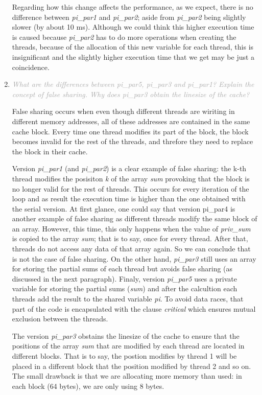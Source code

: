 \documentclass{article}
\newcommand{\greyItem}[1]{\item\emph{\textcolor{darkgray}{#1}}}
\begin{document}
\begin{enumerate}[label=4.\arabic*,leftmargin=*]
Regarding how this change affects the performance, as we expect, there is no difference between \emph{pi\_par1} and \emph{pi\_par2}; aside from \emph{pi\_par2} being slightly slower (by about 10 ms). Although we could think this higher execution time is caused because \emph{pi\_par2} has to do more operations when creating the threads, because of the allocation of this new variable for each thread, this is insignificant and the slightly higher execution time that we get may be just a coincidence.

\greyItem{What are the differences between pi\_par5, pi\_par3 and pi\_par1? Explain the concept of false sharing. 
Why does pi\_par3 obtain the linesize of the cache?}

False sharing occurs when even though different threads are wiriting in different memory addresses, all of these addresses are contained in the same cache block. Every time one thread modifies its part of the block, the block becomes invalid for the rest of the threads, and threfore they need to replace the block in their cache.

Version \emph{pi\_par1} (and \emph{pi\_par2}) is a clear example of false sharing: the k-th thread modifies the posisiton \emph{k} of the array \emph{sum} provoking that the block is no longer valid for the rest of threads. This occurs for every iteration of the loop and as result the execution time is higher than the one obtained with the serial version. At first glance, one could say that version pi\_par4 is another example of false sharing as different threads modify the same block of an array. However, this time, this only happens when the value of \emph{priv\_sum} is copied to the array \emph{sum}; that is to say, once for every thread. After that, threads do not access any data of that array again. So we can conclude that is not the case of false sharing. On the other hand, \emph{pi\_par3} still uses an array for storing the partial sums of each thread but avoids false sharing (as discussed in the next paragraph). Finaly, version \emph{pi\_par5} uses a private variable for storing the partial sums (\emph{sum}) and after the calcultion each threads add the result to the shared variable \emph{pi}. To avoid data races, that part of the code is encapsulated with the clause \emph{critical} which ensures mutual exclusion between the threads.

The version \emph{pi\_par3} obstains the linesize of the cache to ensure that the positions of the array \emph{sum} that are modified by each thread are located in different blocks. That is to say, the postion modifies by thread 1 will be placed in a different block that the position modified by thread 2 and so on. The small drawback is that we are allocating more memory than used: in each block (64 bytes), we are only using 8 bytes. 


\end{enumerate}
\end{document}

